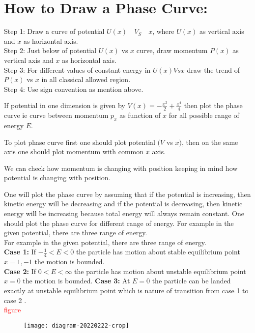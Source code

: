 \section{How to Draw a Phase Curve:}
Step 1: Draw a curve of potential $U(x)\quad V_{S} \quad x$, where $U(x)$ as vertical axis and $x$ as horizontal axis.\\
Step 2: Just below of potential $U(x)$ vs $x$ curve, draw momentum $P(x)$ as vertical axis and $x$ as horizontal axis.\\
Step 3: For different values of constant energy in $U(x) V s x$ draw the trend of $P(x)$ vs $x$ in all classical allowed region.\\
Step 4: Use sign convention as mention above.
\begin{example}
If potential in one dimension is given by $V(x)=-\frac{x^{2}}{2}+\frac{x^{4}}{4}$ then plot the phase curve ie curve between momentum $p_{x}$ as function of $x$ for all possible range of energy $E$.
\end{example}
\begin{answer}
	To plot phase curve first one should plot potential $(V$ vs $x)$, then on the same axis one should plot momentum with common $x$ axis.
	
	We can check how momentum is changing with position keeping in mind how potential is changing with position.
	
	One will plot the phase curve by assuming that if the potential is increasing, then kinetic energy will be decreasing and if the potential is decreasing, then kinetic energy will be increasing because total energy will always remain constant. One should plot the phase curve for different range of energy.
	For example in the given potential, there are three range of energy.\\
For example in the given potential, there are three range of energy.\\ 
\textbf{Case 1:}  If $-\frac{1}{4}<E<0$ the particle has motion about stable equilibrium point $x=1,-1$ the motion is bounded.\\
\textbf{Case 2:} If $0<E<\infty$ the particle has motion about unstable equilibrium point $x=0$ the motion is bounded.
\textbf{Case 3:} At $E=0$ the particle can be landed exactly at unstable equilibrium point which is nature of transition from case 1 to case 2 .\\
\textcolor{red}{figure}
\begin{figure}[H]
	\centering
	\texttt{[image: diagram-20220222-crop]}
\end{figure}
\end{answer}
